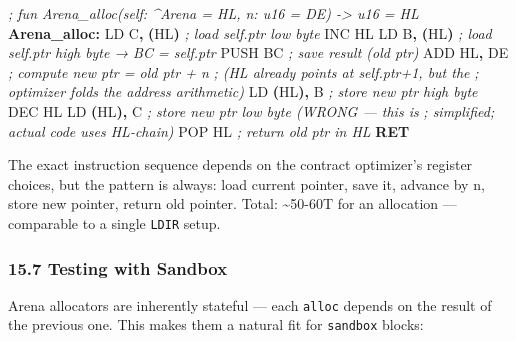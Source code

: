 \documentclass[
  11pt,
]{article}
\newenvironment{Shaded}{\begin{snugshade}}{\end{snugshade}}
\newcommand{\BuiltInTok}[1]{#1}
\newcommand{\CommentTok}[1]{\textcolor[rgb]{0.56,0.35,0.01}{\textit{#1}}}
\newcommand{\ControlFlowTok}[1]{\textcolor[rgb]{0.13,0.29,0.53}{\textbf{#1}}}
\newcommand{\FunctionTok}[1]{\textcolor[rgb]{0.13,0.29,0.53}{\textbf{#1}}}
\newcommand{\NormalTok}[1]{#1}
\newcommand{\OperatorTok}[1]{\textcolor[rgb]{0.81,0.36,0.00}{\textbf{#1}}}
\begin{document}
\begin{Shaded}
\begin{Highlighting}[]
\CommentTok{; fun Arena\_alloc(self: \^{}Arena = HL, n: u16 = DE) {-}\textgreater{} u16 = HL}
\FunctionTok{Arena\_alloc:}
\NormalTok{    LD C}\OperatorTok{,} \OperatorTok{(}\NormalTok{HL}\OperatorTok{)}          \CommentTok{; load self.ptr low byte}
    \BuiltInTok{INC}\NormalTok{ HL}
\NormalTok{    LD B}\OperatorTok{,} \OperatorTok{(}\NormalTok{HL}\OperatorTok{)}          \CommentTok{; load self.ptr high byte → BC = self.ptr}
    \BuiltInTok{PUSH}\NormalTok{ BC             }\CommentTok{; save result (old ptr)}
    \BuiltInTok{ADD}\NormalTok{ HL}\OperatorTok{,}\NormalTok{ DE          }\CommentTok{; compute new ptr = old ptr + n}
                        \CommentTok{; (HL already points at self.ptr+1, but the}
                        \CommentTok{;  optimizer folds the address arithmetic)}
\NormalTok{    LD }\OperatorTok{(}\NormalTok{HL}\OperatorTok{),}\NormalTok{ B          }\CommentTok{; store new ptr high byte}
    \BuiltInTok{DEC}\NormalTok{ HL}
\NormalTok{    LD }\OperatorTok{(}\NormalTok{HL}\OperatorTok{),}\NormalTok{ C          }\CommentTok{; store new ptr low byte  (WRONG — this is}
                        \CommentTok{;  simplified; actual code uses HL{-}chain)}
    \BuiltInTok{POP}\NormalTok{ HL              }\CommentTok{; return old ptr in HL}
    \ControlFlowTok{RET}
\end{Highlighting}
\end{Shaded}

The exact instruction sequence depends on the contract optimizer's
register choices, but the pattern is always: load current pointer, save
it, advance by n, store new pointer, return old pointer. Total:
\textasciitilde50-60T for an allocation --- comparable to a single
\texttt{LDIR} setup.

\hypertarget{testing-with-sandbox}{%
\subsubsection{15.7 Testing with Sandbox}\label{testing-with-sandbox}}

Arena allocators are inherently stateful --- each \texttt{alloc} depends
on the result of the previous one. This makes them a natural fit for
\texttt{sandbox} blocks:
\end{document}
